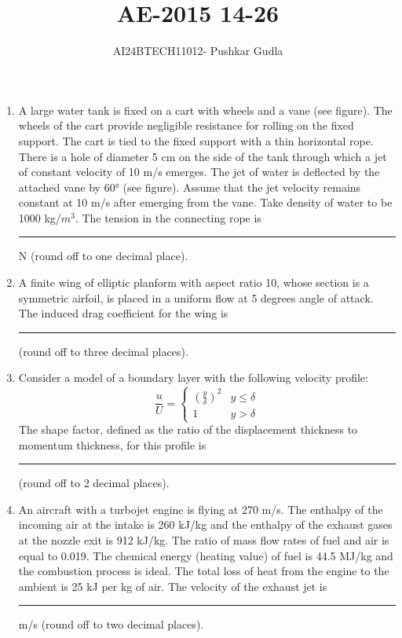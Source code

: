 \documentclass[journal,12pt,onecolumn]{IEEEtran}
\theoremstyle{remark}
\begin{document}

\vspace{3cm}

\title{\textbf{AE-2015 14-26}}
\author{AI24BTECH11012- Pushkar Gudla}
\maketitle
\bigskip

\renewcommand{\thefigure}{\theenumi}
\renewcommand{\thetable}{\theenumi}
\setlength{\columnsep}{2.5em}

\begin{enumerate}
    \item A large water tank is fixed on a cart with wheels and a vane (see figure). The wheels of the cart provide negligible resistance for rolling on the fixed support. The cart is tied to the fixed support with a thin horizontal rope. There is a hole of diameter 5 cm on the side of the tank through which a jet of constant velocity of 10 m/s emerges. The jet of water is deflected by the attached vane by 60° (see figure). Assume that the jet velocity remains constant at 10 m/s after emerging from the vane. Take density of water to be 1000 kg/$m^3$. The tension in the connecting rope is \rule{1.5cm}{0.4pt} N (round off to one decimal place).
    
    \item A finite wing of elliptic planform with aspect ratio 10, whose section is a symmetric airfoil, is placed in a uniform flow at 5 degrees angle of attack. The induced drag coefficient for the wing is \rule{1.5cm}{0.4pt} (round off to three decimal places).
    
    \item Consider a model of a boundary layer with the following velocity profile:
\[
\frac{u}{U} = 
\begin{cases} 
\left( \frac{y}{\delta} \right)^2 & y \leq \delta \\ 
1 & y > \delta 
\end{cases}
\]
The shape factor, defined as the ratio of the displacement thickness to momentum thickness, for this profile is \rule{1.5cm}{0.4pt}  (round off to 2 decimal places).

\item An aircraft with a turbojet engine is flying at 270 m/s. The enthalpy of the incoming air at the intake is 260 kJ/kg and the enthalpy of the exhaust gases at the nozzle exit is 912 kJ/kg. The ratio of mass flow rates of fuel and air is equal to 0.019. The chemical energy (heating value) of fuel is 44.5 MJ/kg and the combustion process is ideal. The total loss of heat from the engine to the ambient is 25 kJ per kg of air. The velocity of the exhaust jet is \rule{1.5cm}{0.4pt} m/s (round off to two decimal places).


\end{enumerate}
\end{document}
